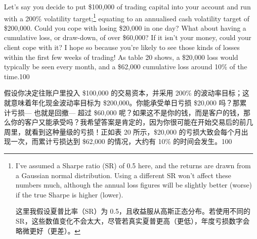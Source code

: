 
\begin{englishblock} Let's say you decide to put \$100,000 of trading capital into your account and run with a 200\% volatility target;\footnote{I've assumed a Sharpe ratio (SR) of 0.5 here, and the returns are drawn from a Gaussian normal distribution. Using a different SR won't affect these numbers much, although the annual loss figures will be slightly better (worse) if the true Sharpe is higher (lower). \par 这里我假设夏普比率（SR）为 0.5，且收益服从高斯正态分布。若使用不同的 SR，这些数值变化不会太大，尽管若真实夏普更高（更低），年度亏损数字会略微更好（更差）。} equating to an annualised cash volatility target of \$200,000. Could you cope with losing \$20,000 in one day? What about having a cumulative loss, or draw-down, of over \$60,000? If it isn't your money, could your client cope with it? I hope so because you're likely to see those kinds of losses within the first few weeks of trading! As table 20 shows, a \$20,000 loss would typically be seen every month, and a \$62,000 cumulative loss around 10\% of the time.100 \end{englishblock}

\begin{chineseblock}假设你决定往账户里投入 \$100,000 的交易资本，并采用 200\% 的波动率目标；这就意味着年化现金波动率目标为 \$200,000。你能承受单日亏损 \$20,000 吗？那累计亏损--- 也就是回撤--- 超过 \$60,000 呢？如果这不是你的钱，而是客户的钱，那么你的客户又能承受吗？我希望答案是肯定的，因为你很可能在开始交易后的前几周里，就看到这种量级的亏损！正如表 20 所示，\$20,000 的亏损大致会每个月出现一次，而累计亏损达到 \$62,000 的情况，大约有 10\% 的时间会发生。100 \end{chineseblock}

